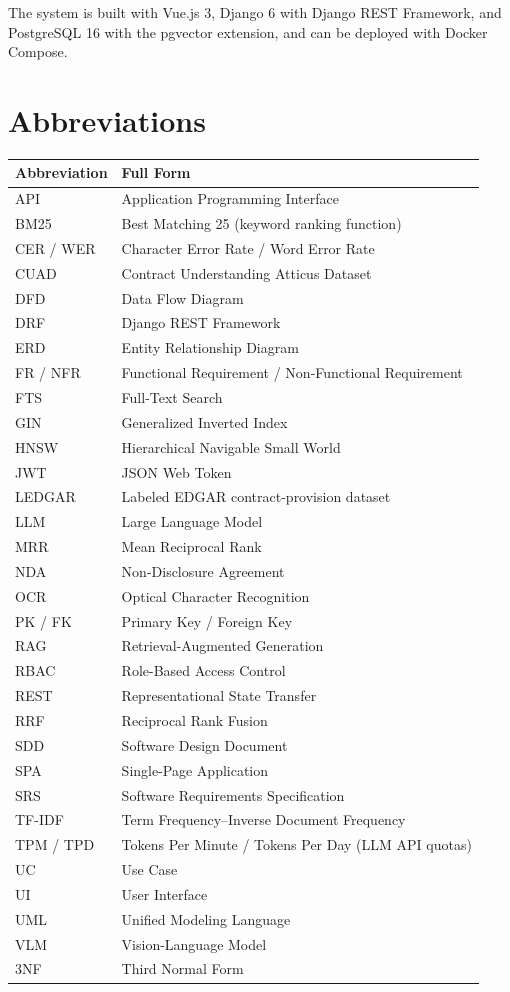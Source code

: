 The system is built with Vue.js 3, Django 6 with Django REST Framework, and PostgreSQL 16 with the
pgvector extension, and can be deployed with Docker Compose.

\chapter*{Abbreviations}
\begin{longtable}{p{3.2cm}p{11.5cm}}
\toprule
\textbf{Abbreviation} & \textbf{Full Form} \\ \midrule
\endhead
API & Application Programming Interface \\
BM25 & Best Matching 25 (keyword ranking function) \\
CER / WER & Character Error Rate / Word Error Rate \\
CUAD & Contract Understanding Atticus Dataset \\
DFD & Data Flow Diagram \\
DRF & Django REST Framework \\
ERD & Entity Relationship Diagram \\
FR / NFR & Functional Requirement / Non-Functional Requirement \\
FTS & Full-Text Search \\
GIN & Generalized Inverted Index \\
HNSW & Hierarchical Navigable Small World \\
JWT & JSON Web Token \\
LEDGAR & Labeled EDGAR contract-provision dataset \\
LLM & Large Language Model \\
MRR & Mean Reciprocal Rank \\
NDA & Non-Disclosure Agreement \\
OCR & Optical Character Recognition \\
PK / FK & Primary Key / Foreign Key \\
RAG & Retrieval-Augmented Generation \\
RBAC & Role-Based Access Control \\
REST & Representational State Transfer \\
RRF & Reciprocal Rank Fusion \\
SDD & Software Design Document \\
SPA & Single-Page Application \\
SRS & Software Requirements Specification \\
TF-IDF & Term Frequency--Inverse Document Frequency \\
TPM / TPD & Tokens Per Minute / Tokens Per Day (LLM API quotas) \\
UC & Use Case \\
UI & User Interface \\
UML & Unified Modeling Language \\
VLM & Vision-Language Model \\
3NF & Third Normal Form \\
\bottomrule
\end{longtable}
